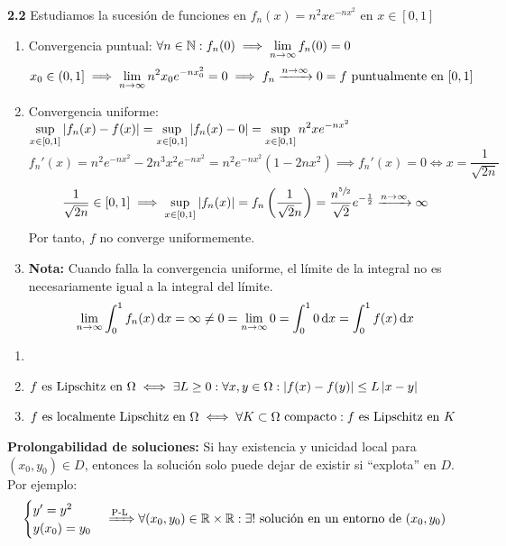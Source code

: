 \textbf{2.2} Estudiamos la sucesión de funciones en $f_n(x)=n^2xe^{-nx^2} $ en $x\in [0,1]$
\begin{enumerate}
	\item Convergencia puntual: $\displaystyle \forall n \in \mathbb{N} : f_n(0) \implies \lim_{n\to\infty} f_n(0) = 0$
	      \[x_0 \in (0, 1] \implies \lim_{n\to \infty} n^2x_0e^{-nx_0^2} = 0 \implies f_n\xrightarrow{n\to \infty} 0 = f \text{ puntualmente en } [0,1]\]
	\item Convergencia uniforme: $\displaystyle \sup_{x\in [0,1]} \left|f_n(x)-f(x)\right| = \sup_{x\in [0,1]} \left|f_n(x)-0\right| = \sup_{x\in [0,1]} n^2xe^{-nx^2}$
	      \[f_n'(x) = n^2e^{-nx^2} - 2n^3x^2e^{-nx^2} = n^2e^{-nx^2}(1-2nx^2) \implies f_n'(x)=0 \iff x=\frac{1}{\sqrt{2n}}\]
	      \[\frac{1}{\sqrt{2n}} \in [0, 1] \implies \sup_{x\in[0, 1]} \left|f_n(x)\right| = f_n\left(\frac{1}{\sqrt{2}n}\right) = \frac{n^{\sfrac{5}{2}}}{\sqrt{2}}e^{-\frac{1}{2}} \xrightarrow{n\to\infty} \infty\]
	      Por tanto, $f$ no converge uniformemente.
	\item \textbf{Nota:} Cuando falla la convergencia uniforme, el límite de la integral no es necesariamente igual a la integral del límite.
	      \[\ds \lim_{n\to\infty} \int_{0}^{1} f_n(x) \odif{x} = \infty \ne 0 = \lim_{n\to\infty} 0 = \int_{0}^{1} 0 \odif{x} = \int_{0}^{1} f(x) \odif{x}\]
\end{enumerate}

\begin{obs}
	\begin{enumerate}
		\item[]
		\item $\displaystyle f \text{ es Lipschitz en } \Omega \iff \exists L \geq 0 : \forall x, y \in \Omega : \left|f(x)-f(y)\right|\leq L\left|x-y\right|$
		\item $\displaystyle f \text{ es localmente Lipschitz en } \Omega \iff \forall K \subset \Omega \text{ compacto} : f \text{ es Lipschitz en } K$
	\end{enumerate}
\end{obs}


\textbf{Prolongabilidad de soluciones:}
Si hay existencia y unicidad local para $(x_0, y_0)\in D$, entonces la solución solo puede dejar de existir si ``explota'' en $D$. Por ejemplo:
\[\begin{cases}
		y' = y^2 \\
		y(x_0) = y_0
	\end{cases} \xRightarrow{\text{P-L}} \forall (x_0, y_0) \in \mathbb{R}\times\mathbb{R} : \exists ! \text{ solución en un entorno de } (x_0, y_0)\]

